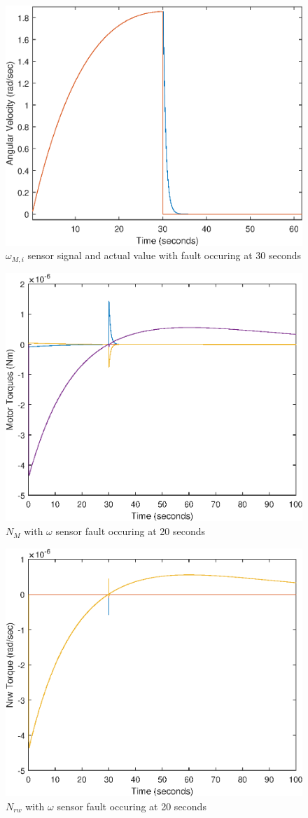 \begin{figure}
	\centering
	\includegraphics[width=120mm]{figures/omegaSensorfault_omega}
	\caption{$\omega_{M,i}$ sensor signal and actual value with fault occuring at 30 seconds}
\end{figure} 

\begin{figure}
	\centering
	\includegraphics[width=120mm]{figures/omegaSensorfault_Nmotor}
	\caption{$N_M$ with $\omega$ sensor fault occuring at 20 seconds}
\end{figure} 

\begin{figure}
	\centering
	\includegraphics[width=120mm]{figures/omegaSensorfault_Nrw}
	\caption{$N_{rw}$ with $\omega$ sensor fault occuring at 20 seconds}
\end{figure} 
